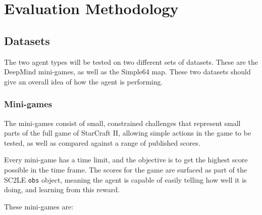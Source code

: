\chapter{Evaluation Methodology}%
\label{eval_method}

\section{Datasets}

The two agent types will be tested on two different sets of datasets.
These are the DeepMind mini-games, as well as the Simple64 map. These two
datasets should give an overall idea of how the agent is performing.

\subsection{Mini-games}

The mini-games consist of small, constrained challenges that represent
small parts of the full game of StarCraft II, allowing simple actions
in the game to be tested, as well as compared against a range of
published scores.

Every mini-game has a time limit, and the objective is to get the
highest score possible in the time frame. The scores for the game are surfaced
as part of the SC2LE \texttt{obs} object, meaning the agent is capable of easily
telling how well it is doing, and learning from this reward.

These mini-games are:

